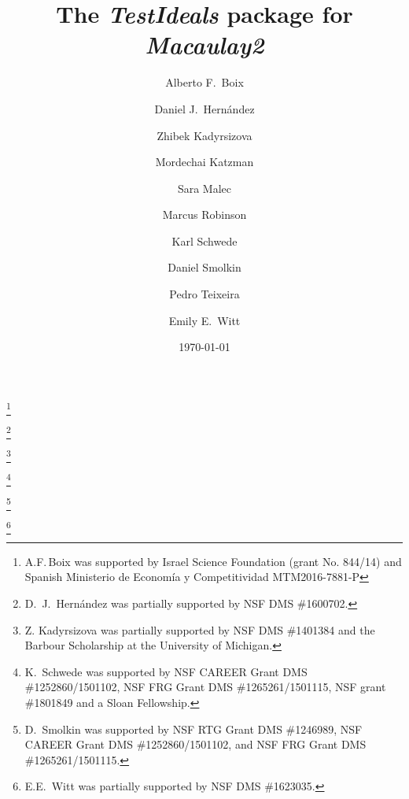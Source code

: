 \documentclass{amsart}
\begin{document}
\title{The  \emph{TestIdeals} package for \emph{Macaulay2}}
\author[Alberto F.\ Boix et al.]{Alberto F.\ Boix}
\address{Department of Mathematics, Ben-Gurion University of the Negev, Beer-Sheva 8410501, Israel}
\thanks{A.F.\,Boix was supported by Israel Science Foundation (grant No. 844/14) and Spanish Ministerio de Econom\'ia y Competitividad MTM2016-7881-P}

\author[]{Daniel J.\ Hern\'andez}
\address{Department of Mathematics, University of Kansas, Lawrence, KS~66045, USA}
\thanks{D.~J.~Hern\'andez was partially supported by NSF DMS \#1600702.}

\author[]{Zhibek Kadyrsizova}
\address{School of Science and Technology, Nazarbayev University, Astana, 010000, Republic of Kazakhstan}
\thanks{Z. Kadyrsizova was partially supported by NSF DMS \#1401384 and the Barbour Scholarship at the University of Michigan.}

\author[]{Mordechai Katzman}
\address{Department of Pure Mathematics, University of Sheffield, Sheffield S37RH, United Kingdom}

\author[]{Sara Malec}
\address{Department of Mathematics, Hood College, Frederick, MD 21701}

\author[]{Marcus Robinson}
\address{Department of Mathematics, University of Utah, Salt Lake City, UT~84112, USA}

\author[]{Karl Schwede}
\address{Department of Mathematics, University of Utah, Salt Lake City, UT~84112, USA}
\thanks{K.~Schwede was supported by NSF CAREER Grant DMS \#1252860/1501102, NSF FRG Grant DMS \#1265261/1501115, NSF grant \#1801849 and a Sloan Fellowship.}

\author[]{Daniel Smolkin}
\address{Department of Mathematics, University of Utah, Salt Lake City, UT~84112, USA}
\thanks{D.~Smolkin was supported by NSF RTG Grant DMS \#1246989, NSF CAREER Grant DMS \#1252860/1501102, and NSF FRG Grant DMS \#1265261/1501115.}

\author[]{Pedro Teixeira}
\address{Department of Mathematics, Knox College, Galesburg, IL~61401, USA}

\author[]{Emily E.\ Witt}
\address{Department of Mathematics, University of Kansas, Lawrence, KS~66045, USA}
\thanks{E.E.~Witt was partially supported by NSF DMS \#1623035.}
\date{\today}
\end{document}
